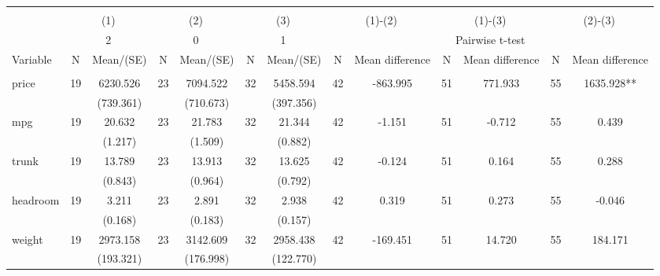 
\begin{tabular}{@{\extracolsep{5pt}}lcccccccccccc}
\\[-1.8ex]\hline \hline \\[-1.8ex]
 & \multicolumn{2}{c}{(1)}  & \multicolumn{2}{c}{(2)}  & \multicolumn{2}{c}{(3)}  & \multicolumn{2}{c}{(1)-(2)} & \multicolumn{2}{c}{(1)-(3)} & \multicolumn{2}{c}{(2)-(3)} \\
 & \multicolumn{2}{c}{2}  & \multicolumn{2}{c}{0}  & \multicolumn{2}{c}{1}  & \multicolumn{6}{c}{Pairwise t-test}  \\
Variable & N & Mean/(SE) & N & Mean/(SE) & N & Mean/(SE) & N & Mean difference & N & Mean difference & N & Mean difference \\ \hline \\[-1.8ex] 
price   & 19    & 6230.526    & 23    & 7094.522    & 32    & 5458.594    & 42    & -863.995    & 51    & 771.933    & 55    & 1635.928**   \\
 &   & (739.361)  &   & (710.673)  &   & (397.356)  &   &  &   &  &   &  \\ [1ex]
mpg   & 19    & 20.632    & 23    & 21.783    & 32    & 21.344    & 42    & -1.151    & 51    & -0.712    & 55    & 0.439   \\
 &   & (1.217)  &   & (1.509)  &   & (0.882)  &   &  &   &  &   &  \\ [1ex]
trunk   & 19    & 13.789    & 23    & 13.913    & 32    & 13.625    & 42    & -0.124    & 51    & 0.164    & 55    & 0.288   \\
 &   & (0.843)  &   & (0.964)  &   & (0.792)  &   &  &   &  &   &  \\ [1ex]
headroom   & 19    & 3.211    & 23    & 2.891    & 32    & 2.938    & 42    & 0.319    & 51    & 0.273    & 55    & -0.046   \\
 &   & (0.168)  &   & (0.183)  &   & (0.157)  &   &  &   &  &   &  \\ [1ex]
weight   & 19    & 2973.158    & 23    & 3142.609    & 32    & 2958.438    & 42    & -169.451    & 51    & 14.720    & 55    & 184.171   \\
 &   & (193.321)  &   & (176.998)  &   & (122.770)  &   &  &   &  &   &  \\ [1ex]

\end{tabular}
